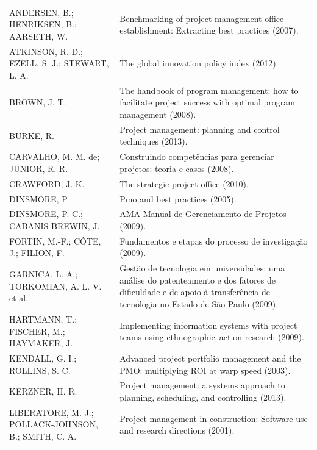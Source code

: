 \begin{longtable}{| p{} | p{} |}
  \cline{1-2}
  \cellcolor[HTML]{C0C0C0}{\color[HTML]{000000} Autor(es)} & \cellcolor[HTML]{C0C0C0}{\color[HTML]{000000} Publicação} \\ \hline
    ANDERSEN, B.; HENRIKSEN, B.; AARSETH, W. &
    Benchmarking of project management office establishment: Extracting best practices (2007). \\ \hline
    ATKINSON, R. D.; EZELL, S. J.; STEWART, L. A. &
    The global innovation policy index (2012). \\ \hline
    BROWN, J. T. &
    The handbook of program management: how to facilitate project success with optimal program management (2008). \\ \hline
    BURKE, R. &
    Project management: planning and control techniques (2013). \\ \hline
    CARVALHO, M. M. de; JUNIOR, R. R. &
    Construindo competências para gerenciar projetos: teoria e casos (2008). \\ \hline
    CRAWFORD, J. K. &
    The strategic project office (2010).\\ \hline
    DINSMORE, P. &
    Pmo and best practices (2005). \\ \hline
    DINSMORE, P. C.; CABANIS-BREWIN, J. &
    AMA-Manual de Gerenciamento de Projetos (2009). \\ \hline
    FORTIN, M.-F.; CÔTE, J.; FILION, F. &
    Fundamentos e etapas do processo de investigação (2009). \\ \hline
    GARNICA, L. A.; TORKOMIAN, A. L. V. et al. &
    Gestão de tecnologia em universidades: uma análise do patenteamento e dos fatores de dificuldade e de apoio à transferência de tecnologia no Estado de São Paulo (2009). \\ \hline
    HARTMANN, T.; FISCHER, M.; HAYMAKER, J. &
    Implementing information systems with project teams using ethnographic–action research (2009). \\ \hline
    KENDALL, G. I.; ROLLINS, S. C. &
    Advanced project portfolio management and the PMO: multiplying ROI at warp speed (2003). \\ \hline
    KERZNER, H. R. &
    Project management: a systems approach to planning, scheduling, and controlling (2013). \\ \hline
    LIBERATORE, M. J.; POLLACK-JOHNSON, B.; SMITH, C. A. &
    Project management in construction: Software use and research directions (2001). \\ \hline

\end{longtable}
